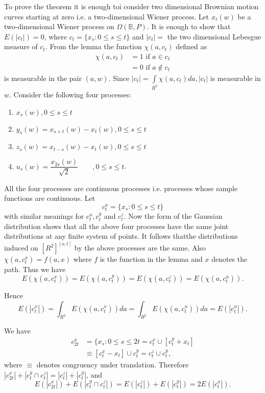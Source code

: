 \begin{pot*}
  To prove the theorem it is enough toi consider two dimensional
  Brownian motion curves starting at zero i.e. a two-dimen\-sional
  Wiener process. Let $x_t(w)$ be a two-dimensional Wiener process on
  $\Omega (\mathbb{B},P)$. It is enough to show that $E(|c_t|)=0$,
  where $c_t= \{ x_s: 0 \leq s \leq t \}$ and $|c_t|=$ the two
  dimensional Lebesgue measure of $c_t$. From the lemma the function
  $\chi (a,c_t)$ defined as 
  \begin{align*}
    \chi (a,c_t) & = 1 \text{ if } a \in c_t\\
    &= 0 \text{ if }a \notin c_t
  \end{align*}
  is measurable in the pair $(a,w)$. Since $|c_t|=\int
  \limits_{R^2}\chi (a,c_t)da, |c_t|$ is measurable in $w$. Consider
  the following four processes: 
  \begin{enumerate}
  \item $x_s (w),0 \leq s \leq t$
  \item $y_s(w)=x_{s+t}(w)-x_t(w),0 \leq s \leq t$
  \item $z_s (w)=x_{t-s}(w)-x_t(w),0 \leq s \leq t$
  \item $u_s(w)=\dfrac{x_{2s}(w)}{\sqrt{2}} \qquad ,0 \leq s \leq t$.
  \end{enumerate}

  All the four processes are continuous processes i.e. processes whose
  sample functions are continuous. Let 
  $$
  c^x_t=\{ x_s : 0 \leq s \leq t \}
  $$
  with similar meanings for $c^u_t,c^y_t$ and $c^z_t$. Now the form of
  the Gaussian distribution shows that all the above four processes
  have the same joint distributions at any finite system of points. It
  follows that\pageoriginale the distributions induced on $[R^2]^{[o,t]}$ by the
  above processes are the same. Also $\chi (a,c^x_t)=f(a,x)$ where $f$
  is the function in the lemma and $x$ denotes the path. Thus we have 
  $$
  E(\chi(a,c^x_t))=E(\chi(a,c^y_t))=E(\chi(a,c^z_t))=E(\chi(a,c^u_t)).
  $$

  Hence
  $$
  E(|c^x_t|)=\int_{R^2}E (\chi(a,c^x_t))da=\int_{R^2}E (\chi(a,
  c^u_t))da=E(|c^u_t|). 
  $$

  We have
  \begin{align*}
    c^x_{2t}&= \{ x_s:0\leq s \leq 2t =c^x_t \cup [c^y_t+x_t]\\
    & \equiv [c^x_t - x_t] \cup c^y_t=c^z_t \cup c^y_t,
  \end{align*}
  where $\equiv$ denotes congruency under translation. Therefore
  $|c^x_{2t}|+|c^y_t \cap c^z_t|=|c^z_t|+|c^y_t|$, and 
  $$
  E(|c^x_{2t}|)+E(|c^y_t \cap c^z_t|)=E(|c^z_t|)+E(|c^y_t|)=2E(|c^x_t|).
  $$


\end{pot*}
